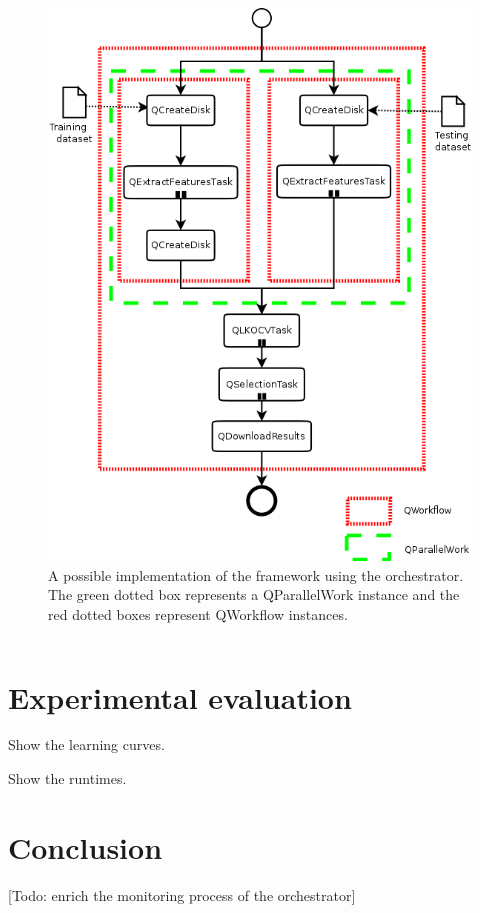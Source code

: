 \documentclass[10pt, conference, compsocconf]{IEEEtran}
\begin{document}
\begin{figure}[h]
\centering
\includegraphics[scale=0.4]{Figures/implementation_vertical.png}
\caption{A possible implementation of the framework using the orchestrator. The green dotted box represents a QParallelWork instance and the red dotted boxes represent QWorkflow instances.}
\label{fig:implementation_diagram}
\end{figure}
\begin{mdframed}[backgroundcolor=LightGray,topline=false, bottomline=false,leftline=false, rightline=false]
\inputminted[baselinestretch=1, fontsize=\scriptsize]{python}{selection.py}
\end{mdframed}
\label{fig:implementation_code}
\section{Experimental evaluation} \label{Proof-of-concept}

Show the learning curves.

Show the runtimes.


\section{Conclusion} \label{Conclusion}

[Todo: enrich the monitoring process of the orchestrator]









\end{document}
